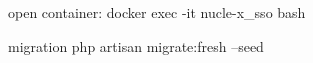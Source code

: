 open container:
    docker exec -it nucle-x_sso bash

migration
    php artisan migrate:fresh --seed

